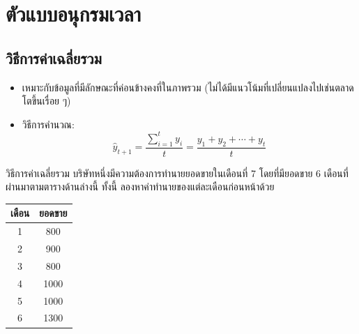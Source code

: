 
\section{ตัวแบบอนุกรมเวลา}
\subsection{วิธีการค่าเฉลี่ยรวม}
\begin{itemize}
    \item เหมาะกับข้อมูลที่มีลักษณะที่ค่อนข้างคงที่ในภาพรวม (ไม่ได้มีแนวโน้มที่เปลี่ยนแปลงไปเช่นตลาดโตขึ้นเรื่อย ๆ)
    \item วิธีการคำนวณ:
    \[
    \hat{y}_{t+1} = \frac{\sum_{i=1}^{t} y_i}{t} = \frac{y_1 + y_2 + \cdots + y_t}{t}
    \]
\end{itemize}

\begin{example}
    {วิธีการค่าเฉลี่ยรวม}{}
    บริษัทหนึ่งมีความต้องการทำนายยอดขายในเดือนที่ 7 โดยที่มียอดขาย 6 เดือนที่ผ่านมาตามตารางด้านล่างนี้ ทั้งนี้ ลองหาค่าทำนายของแต่ละเดือนก่อนหน้าด้วย
\end{example}
\begin{tabular}{|c|c|}
\hline
เดือน & ยอดขาย \\ \hline
1     & 800    \\ \hline
2     & 900    \\ \hline
3     & 800    \\ \hline
4     & 1000   \\ \hline
5     & 1000   \\ \hline
6     & 1300   \\ \hline
\end{tabular}
\newpage
